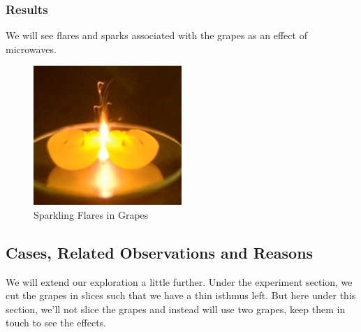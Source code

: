 \documentclass{article}
\begin{document}
\subsubsection{\Large Results}
\large
We will see flares and sparks associated with the grapes as an effect of microwaves.

 \begin{figure}[h]
        \centering
        \includegraphics[width=0.5\textwidth ]{Grape-1.png}
        \caption{\label{fig:Sparkling Effects} Sparkling Flares in Grapes}
    \end{figure}



\subsection{Cases, Related Observations and Reasons }

We will extend our exploration a little further. Under the experiment section, we cut the grapes in slices such that we have a thin isthmus left. 
But here under this section, we'll not slice the grapes and instead will use two grapes, keep them in touch to see the effects.
\end{document}
